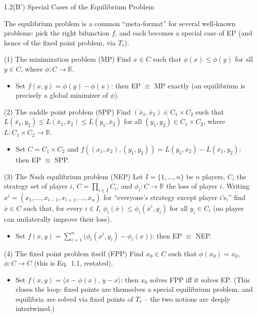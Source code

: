\documentclass[aspectratio=169,10pt]{beamer}
\newcommand{\R}{\mathbb{R}}
\begin{document}
\begin{frame}[allowframebreaks]{1.2(B$'$) Special Cases of the Equilibrium Problem}

The equilibrium problem is a common ``meta-format'' for several
well-known problems: pick the right bifunction $f$, and each becomes a
special case of EP (and hence of the fixed point problem, via $T_r$).

\begin{block}{(1) The minimization problem (MP)}
Find $x\in C$ such that $\phi(x)\le\phi(y)$ for all $y\in C$, where
$\phi:C\to\R$.
\begin{itemize}
  \item Set $f(x,y)=\phi(y)-\phi(x)$: then EP $\equiv$ MP exactly (an
    equilibrium is precisely a global minimizer of $\phi$).
\end{itemize}
\end{block}

\begin{block}{(2) The saddle point problem (SPP)}
Find $(\bar x_1,\bar x_2)\in C_1\times C_2$ such that
$L(\bar x_1,y_2)\le L(\bar x_1,\bar x_2)\le L(y_1,\bar x_2)$ for all
$(y_1,y_2)\in C_1\times C_2$, where $L:C_1\times C_2\to\R$.
\begin{itemize}
  \item Set $C=C_1\times C_2$ and
    $f((x_1,x_2),(y_1,y_2))=L(y_1,x_2)-L(x_1,y_2)$: then EP $\equiv$ SPP.
\end{itemize}
\end{block}

\framebreak

\begin{block}{(3) The Nash equilibrium problem (NEP)}
Let $I=\{1,\dots,n\}$ be $n$ players, $C_i$ the strategy set of player
$i$, $C=\prod_{i\in I}C_i$, and $\phi_i:C\to\R$ the loss of player $i$.
Writing $x^i=(x_1,\dots,x_{i-1},x_{i+1},\dots,x_n)$ for ``everyone's
strategy except player $i$'s,'' find $\bar x\in C$ such that, for every
$i\in I$, $\phi_i(\bar x)\le \phi_i(\bar x^i,y_i)$ for all $y_i\in C_i$
(no player can unilaterally improve their loss).
\begin{itemize}
  \item Set $f(x,y)=\sum_{i=1}^n\big(\phi_i(x^i,y_i)-\phi_i(x)\big)$: then
    EP $\equiv$ NEP.
\end{itemize}
\end{block}

\begin{block}{(4) The fixed point problem itself (FPP)}
Find $x_0\in C$ such that $\phi(x_0)=x_0$, $\phi:C\to C$ (this is Eq.\
1.1, restated).
\begin{itemize}
  \item Set $f(x,y)=\langle x-\phi(x),\,y-x\rangle$: then $x_0$ solves FPP
    iff it solves EP. (This closes the loop: fixed points are themselves
    a special equilibrium problem, and equilibria are solved via fixed
    points of $T_r$ -- the two notions are deeply intertwined.)
\end{itemize}
\end{block}


\end{frame}
\end{document}
